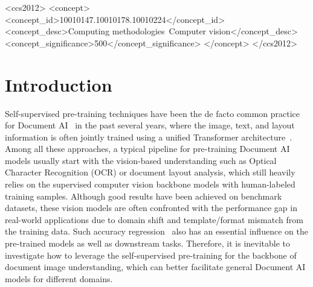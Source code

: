 \documentclass[sigconf]{acmart}
\begin{document}
\begin{CCSXML}
<ccs2012>
    <concept>
       <concept_id>10010147.10010178.10010224</concept_id>
       <concept_desc>Computing methodologies~Computer vision</concept_desc>
       <concept_significance>500</concept_significance>
    </concept>
</ccs2012>
\end{CCSXML}








\maketitle

\section{Introduction}

Self-supervised pre-training techniques have been the de facto common practice for Document AI~\citep{cui2021document} in the past several years, where the image, text, and layout information is often jointly trained using a unified Transformer architecture~\citep{10.1145/3394486.3403172,xu2021layoutlmv2, huang2022layoutlmv3,xu2021layoutxlm,xu-etal-2022-xfund,pramanik2020multimodal,garncarek2021lambert,hong2021bros,powalski2021going,wu2021lampret,li2021structurallm,li2021selfdoc,appalaraju2021docformer}. Among all these approaches, a typical pipeline for pre-training Document AI models usually start with the vision-based understanding such as Optical Character Recognition (OCR) or document layout analysis, which still heavily relies on the supervised computer vision backbone models with human-labeled training samples. Although good results have been achieved on benchmark datasets, these vision models are often confronted with the performance gap in real-world applications due to domain shift and template/format mismatch from the training data. Such accuracy regression~\citep{li-etal-2020-tablebank,zhong2019publaynet} also has an essential influence on the pre-trained models as well as downstream tasks. Therefore, it is inevitable to investigate how to leverage the self-supervised pre-training for the backbone of document image understanding, which can better facilitate general Document AI models for different domains.
\end{document}
